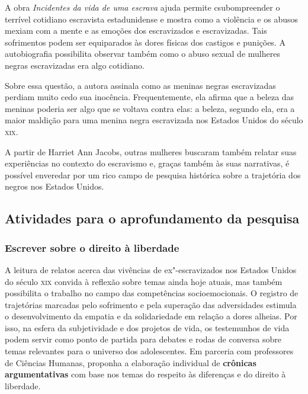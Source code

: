 \documentclass[11pt]{extarticle}
\begin{document}
A obra \emph{Incidentes da vida de uma escrava} ajuda permite
csubompreender o terrível cotidiano escravista estadunidense e mostra como
a violência e os abusos mexiam com a mente e as emoções dos escravizados
e escravizadas. Tais sofrimentos podem ser equiparados às dores físicas
dos castigos e punições. A autobiografia possibilita observar também
como o abuso sexual de mulheres negras escravizadas era algo cotidiano.

Sobre essa questão, a autora assinala como as meninas negras
escravizadas perdiam muito cedo sua inocência. Frequentemente, ela
afirma que a beleza das meninas poderia ser algo que se voltava contra
elas: a beleza, segundo ela, era a maior maldição para uma menina negra
escravizada nos Estados Unidos do século \textsc{xix}.

A partir de Harriet Ann Jacobs, outras mulheres buscaram também relatar
suas experiências no contexto do escravismo e, graças também às suas
narrativas, é possível enveredar por um rico campo de pesquisa histórica
sobre a trajetória dos negros nos Estados Unidos.

\subsection{Atividades para o aprofundamento da pesquisa}


\subsubsection{Escrever sobre o direito à liberdade}

A leitura de relatos acerca das vivências de ex"-escravizados nos
Estados Unidos do século \textsc{xix} convida à reflexão sobre temas ainda hoje
atuais, mas também possibilita o trabalho no campo das competências
socioemocionais. O registro de trajetórias marcadas pelo sofrimento e
pela superação das adversidades estimula o desenvolvimento da empatia
e da solidariedade em relação a dores alheias. Por isso, na esfera da
subjetividade e dos projetos de vida, os testemunhos de vida podem
servir como ponto de partida para debates e rodas de conversa sobre
temas relevantes para o universo dos adolescentes. Em parceria com
professores de Ciências Humanas, proponha a elaboração individual de
\textbf{crônicas argumentativas} com base nos temas do respeito às
diferenças e do direito à liberdade. 
\end{document}
